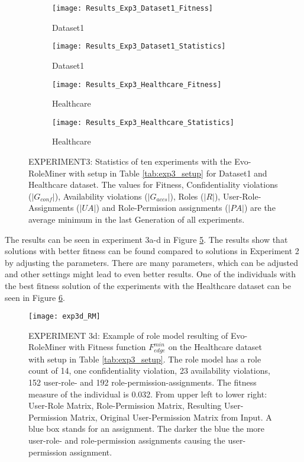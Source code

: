 \begin{figure}[H]
	\centering
	\begin{subfigure}{0.45\textwidth}
		\texttt{[image: Results\_Exp3\_Dataset1\_Fitness]}
		\caption{Dataset1}
		\label{fig:Results_Exp3_Dataset1_Fitness}
	\end{subfigure}%
	\begin{subfigure}{0.55\textwidth}
		\centering
		\texttt{[image: Results\_Exp3\_Dataset1\_Statistics]}
		\caption{Dataset1}
		\label{fig:Results_Exp3_Dataset1_Statistics}
	\end{subfigure}
	\begin{subfigure}{0.45\textwidth}
		\texttt{[image: Results\_Exp3\_Healthcare\_Fitness]}
		\caption{Healthcare}
		\label{fig:Results_Exp3_Healthcare_Fitness}
	\end{subfigure}%
	\begin{subfigure}{0.55\textwidth}
		\centering
		\texttt{[image: Results\_Exp3\_Healthcare\_Statistics]}
		\caption{Healthcare}
		\label{fig:Results_Exp3_Healthcare_Statistics}
	\end{subfigure}
	\caption{EXPERIMENT3: Statistics of ten experiments with the Evo-RoleMiner with setup in Table \ref{tab:exp3_setup} for Dataset1 and Healthcare dataset. The values for Fitness, Confidentiality violations ($|G_{conf}|$), Availability violations ($|G_{accs}|$), Roles ($|R|$), User-Role-Assignments ($|UA|$) and Role-Permission assignments ($|PA|$) are the average minimum in the last Generation of all experiments.}
	\label{fig:Results_Exp3}
\end{figure}

The results can be seen in experiment 3a-d in Figure \ref{fig:Results_Exp3}. The results show that solutions with better fitness can be found compared to solutions in Experiment 2 by adjusting the parameters. There are many parameters, which can be adjusted and other settings might lead to even better results. One of the individuals with the best fitness solution of the experiments with the Healthcare dataset can be seen in Figure \ref{fig:exp3d_RM}.

\begin{figure}[H]
	\centering
	\texttt{[image: exp3d\_RM]}
	\caption{EXPERIMENT 3d: Example of role model resulting of Evo-RoleMiner with Fitness function $F_{edge}^{min}$ on the Healthcare dataset with setup in Table \ref{tab:exp3_setup}. The role model has a role count of 14, one confidentiality violation, 23 availability violations, 152 user-role- and 192 role-permission-assignments. The fitness measure of the individual is 0.032. From upper left to lower right: User-Role Matrix, Role-Permission Matrix, Resulting User-Permission Matrix, Original User-Permission Matrix from Input. A blue box stands for an assignment. The darker the blue the more user-role- and role-permission assignments causing the user-permission assignment.}
	\label{fig:exp3d_RM}
\end{figure}

